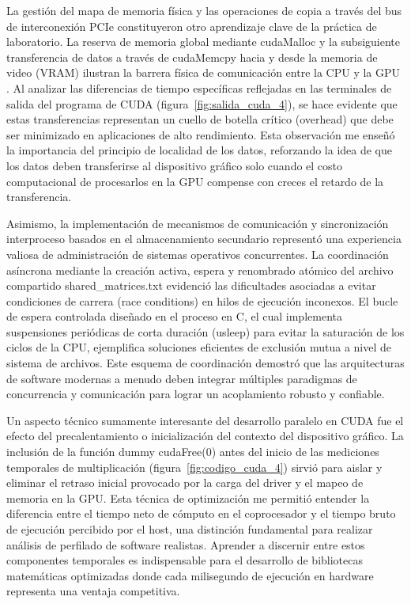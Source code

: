 La gestión del mapa de memoria física y las operaciones de copia a través del bus de interconexión PCIe constituyeron otro aprendizaje clave de la práctica de laboratorio. La reserva de memoria global mediante cudaMalloc y la subsiguiente transferencia de datos a través de cudaMemcpy hacia y desde la memoria de video (VRAM) ilustran la barrera física de comunicación entre la CPU y la GPU \cite{cornellMemory}. Al analizar las diferencias de tiempo específicas reflejadas en las terminales de salida del programa de CUDA (figura~\ref{fig:salida_cuda_4}), se hace evidente que estas transferencias representan un cuello de botella crítico (overhead) que debe ser minimizado en aplicaciones de alto rendimiento. Esta observación me enseñó la importancia del principio de localidad de los datos, reforzando la idea de que los datos deben transferirse al dispositivo gráfico solo cuando el costo computacional de procesarlos en la GPU compense con creces el retardo de la transferencia.

Asimismo, la implementación de mecanismos de comunicación y sincronización interproceso basados en el almacenamiento secundario representó una experiencia valiosa de administración de sistemas operativos concurrentes. La coordinación asíncrona mediante la creación activa, espera y renombrado atómico del archivo compartido shared\_matrices.txt evidenció las dificultades asociadas a evitar condiciones de carrera (race conditions) en hilos de ejecución inconexos. El bucle de espera controlada diseñado en el proceso en C, el cual implementa suspensiones periódicas de corta duración (usleep) para evitar la saturación de los ciclos de la CPU, ejemplifica soluciones eficientes de exclusión mutua a nivel de sistema de archivos. Este esquema de coordinación demostró que las arquitecturas de software modernas a menudo deben integrar múltiples paradigmas de concurrencia y comunicación para lograr un acoplamiento robusto y confiable.

Un aspecto técnico sumamente interesante del desarrollo paralelo en CUDA fue el efecto del precalentamiento o inicialización del contexto del dispositivo gráfico. La inclusión de la función dummy cudaFree(0) antes del inicio de las mediciones temporales de multiplicación (figura~\ref{fig:codigo_cuda_4}) sirvió para aislar y eliminar el retraso inicial provocado por la carga del driver y el mapeo de memoria en la GPU. Esta técnica de optimización me permitió entender la diferencia entre el tiempo neto de cómputo en el coprocesador y el tiempo bruto de ejecución percibido por el host, una distinción fundamental para realizar análisis de perfilado de software realistas. Aprender a discernir entre estos componentes temporales es indispensable para el desarrollo de bibliotecas matemáticas optimizadas donde cada milisegundo de ejecución en hardware representa una ventaja competitiva.

